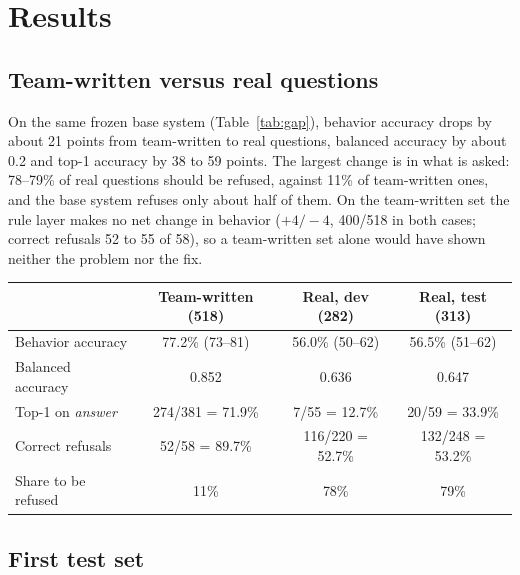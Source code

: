 \section{Results}

\subsection{Team-written versus real questions}

On the same frozen base system (Table~\ref{tab:gap}), behavior accuracy drops by about 21 points from team-written to real questions,
balanced accuracy by about 0.2 and top-1 accuracy by 38 to 59 points. The largest change is in what is asked: 78--79\% of real questions
should be refused, against 11\% of team-written ones, and the base system refuses only about half of them. On the team-written set the rule
layer makes no net change in behavior ($+4/-4$, 400/518 in both cases; correct refusals 52 to 55 of 58), so a team-written set alone
would have shown neither the problem nor the fix.

\begin{table}[h]
{\begin{tabular}{@{}lccc@{}}\toprule
 & Team-written (518) & Real, dev (282) & Real, test (313) \\ \midrule
Behavior accuracy & 77.2\% (73--81) & 56.0\% (50--62) & 56.5\% (51--62) \\
Balanced accuracy & 0.852 & 0.636 & 0.647 \\
Top-1 on \emph{answer} & 274/381 = 71.9\% & 7/55 = 12.7\% & 20/59 = 33.9\% \\
Correct refusals & 52/58 = 89.7\% & 116/220 = 52.7\% & 132/248 = 53.2\% \\
Share to be refused & 11\% & 78\% & 79\% \\ \bottomrule
\end{tabular}}
\end{table}

\subsection{First test set}\label{sec:test1}

